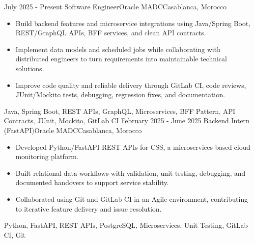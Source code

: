 
\begin{experiences}
  \experience
    {July 2025 - Present}
    {Software Engineer}{Oracle MADC}{Casablanca, Morocco}
    {} {
      \begin{itemize}
        \item Build backend features and microservice integrations using Java/Spring Boot, REST/GraphQL APIs, BFF services, and clean API contracts.
        \item Implement data models and scheduled jobs while collaborating with distributed engineers to turn requirements into maintainable technical solutions.
        \item Improve code quality and reliable delivery through GitLab CI, code reviews, JUnit/Mockito tests, debugging, regression fixes, and documentation.
      \end{itemize}
    }
    {Java, Spring Boot, REST APIs, GraphQL, Microservices, BFF Pattern, API Contracts, JUnit, Mockito, GitLab CI}
  \experience
    {February 2025 - June 2025}
    {Backend Intern (FastAPI)}{Oracle MADC}{Casablanca, Morocco}
    {} {
      \begin{itemize}
        \item Developed Python/FastAPI REST APIs for CSS, a microservices-based cloud monitoring platform.
        \item Built relational data workflows with validation, unit testing, debugging, and documented handovers to support service stability.
        \item Collaborated using Git and GitLab CI in an Agile environment, contributing to iterative feature delivery and issue resolution.
      \end{itemize}
    }
    {Python, FastAPI, REST APIs, PostgreSQL, Microservices, Unit Testing, GitLab CI, Git}
  \emptySeparator
\end{experiences}
